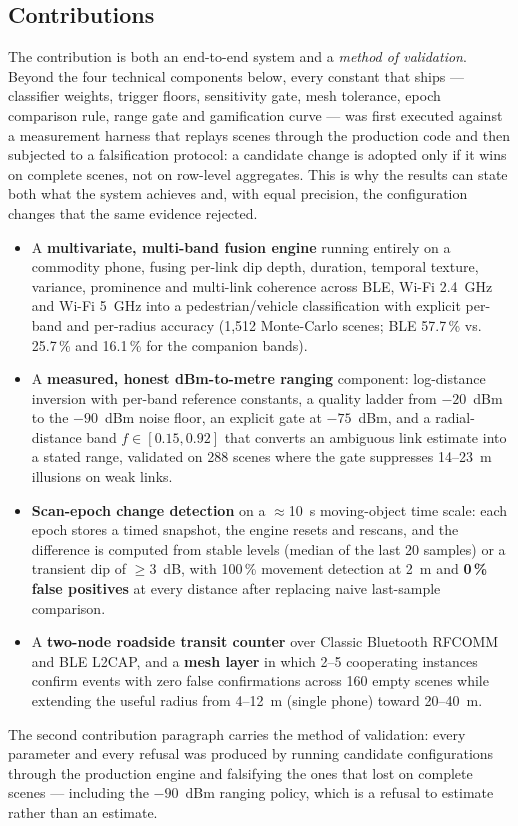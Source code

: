 \documentclass[journal,10pt]{IEEEtran}
\begin{document}
\subsection{Contributions}
The contribution is both an end-to-end system and a \emph{method of validation}.
Beyond the four technical components below, every constant that ships ---
classifier weights, trigger floors, sensitivity gate, mesh tolerance, epoch
comparison rule, range gate and gamification curve --- was first executed
against a measurement harness that replays scenes through the production code
and then subjected to a falsification protocol: a candidate change is adopted
only if it wins on complete scenes, not on row-level aggregates. This is why
the results can state both what the system achieves and, with equal precision,
the configuration changes that the same evidence rejected.
\begin{itemize}
  \item A \textbf{multivariate, multi-band fusion engine} running entirely on a
  commodity phone, fusing per-link dip depth, duration, temporal texture,
  variance, prominence and multi-link coherence across BLE, Wi-Fi 2.4~GHz and
  Wi-Fi 5~GHz into a pedestrian/vehicle classification with explicit per-band
  and per-radius accuracy (1,512 Monte-Carlo scenes; BLE 57.7\,\% vs. 25.7\,\%
  and 16.1\,\% for the companion bands).
  \item A \textbf{measured, honest dBm-to-metre ranging} component: log-distance
  inversion with per-band reference constants, a quality ladder from
  $-20$~dBm to the $-90$~dBm noise floor, an explicit gate at $-75$~dBm, and a
  radial-distance band $f \in [0.15, 0.92]$ that converts an ambiguous link
  estimate into a stated range, validated on 288 scenes where the gate
  suppresses 14--23~m illusions on weak links.
  \item \textbf{Scan-epoch change detection} on a $\approx$10~s moving-object
  time scale: each epoch stores a timed snapshot, the engine resets and
  rescans, and the difference is computed from stable levels (median of the
  last 20 samples) or a transient dip of $\geq 3$~dB, with 100\,\% movement
  detection at 2~m and \textbf{0\,\% false positives} at every distance after
  replacing naive last-sample comparison.
  \item A \textbf{two-node roadside transit counter} over Classic Bluetooth
  RFCOMM and BLE L2CAP, and a \textbf{mesh layer} in which 2--5 cooperating
  instances confirm events with zero false confirmations across 160 empty
  scenes while extending the useful radius from 4--12~m (single phone) toward
  20--40~m.
\end{itemize}
The second contribution paragraph carries the method of validation: every
parameter and every refusal was produced by running candidate configurations
through the production engine and falsifying the ones that lost on complete
scenes --- including the $-90$~dBm ranging policy, which is a refusal to
estimate rather than an estimate.
\end{document}
